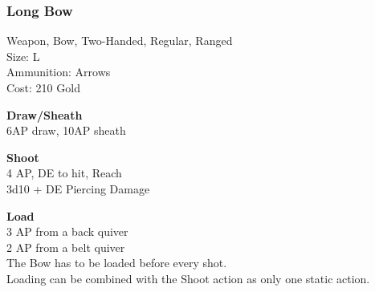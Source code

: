 \subsubsection{Long Bow}\label{weapon:longBow}
Weapon, Bow, Two-Handed, Regular, Ranged\\
Size: L\\
Ammunition: Arrows\\
Cost: 210 Gold

\textbf{Draw/Sheath}\\
6AP draw, 10AP sheath

\textbf{Shoot}\\
4 AP, DE to hit,  Reach\\
3d10 + \texttimes DE Piercing Damage

\textbf{Load}\\
3 AP from a back quiver\\
2 AP from a belt quiver\\
The Bow has to be loaded before every shot.\\
Loading can be combined with the Shoot action as only one static action.